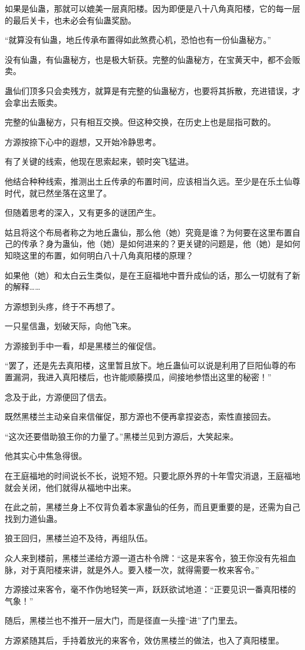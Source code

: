 \begin{this_body}
如果是仙蛊，那就可以媲美一层真阳楼。因为即便是八十八角真阳楼，它的每一层的最后关卡，也未必会有仙蛊奖励。

“就算没有仙蛊，地丘传承布置得如此煞费心机，恐怕也有一份仙蛊秘方。”

没有仙蛊，有仙蛊秘方，也是极大斩获。完整的仙蛊秘方，在宝黄天中，都不会贩卖。

蛊仙们顶多只会卖残方，就算是有完整的仙蛊秘方，也要将其拆散，充进错误，才会拿出去贩卖。

完整的仙蛊秘方，只有相互交换。但这种交换，在历史上也是屈指可数的。

方源按捺下心中的遐想，又开始冷静思考。

有了关键的线索，他现在思索起来，顿时突飞猛进。

他结合种种线索，推测出土丘传承的布置时间，应该相当久远。至少是在乐土仙尊时代，就已然坐落在这里了。

但随着思考的深入，又有更多的谜团产生。

姑且将这个布局者称之为地丘蛊仙，那么他（她）究竟是谁？为何要在这里布置自己的传承？身为蛊仙，他（她）是如何进来的？更关键的问题是，他（她）是如何知晓这里的布置，如何明白八十八角真阳楼的原理？

如果他（她）和太白云生类似，是在王庭福地中晋升成仙的话，那么一切就有了新的解释……

方源想到头疼，终于不再想了。

一只星信蛊，划破天际，向他飞来。

方源接到手中一看，却是黑楼兰的催促信。

“罢了，还是先去真阳楼，这里暂且放下。地丘蛊仙可以说是利用了巨阳仙尊的布置漏洞，我进入真阳楼后，也许能顺藤摸瓜，间接地参悟出这里的秘密！”

念及于此，方源便回了信去。

既然黑楼兰主动亲自来信催促，那方源也不便再拿捏姿态，索性直接回去。

“这次还要借助狼王你的力量了。”黑楼兰见到方源后，大笑起来。

他其实心中焦急得很。

在王庭福地的时间说长不长，说短不短。只要北原外界的十年雪灾消退，王庭福地就会关闭，他们就得从福地中出来。

在此之前，黑楼兰身上不仅背负着本家蛊仙的任务，而且更重要的是，还需为自己找到力道仙蛊。

狼王回归，黑楼兰迫不及待，再组队伍。

众人来到楼前，黑楼兰递给方源一道古朴令牌：“这是来客令，狼王你没有先祖血脉，对于真阳楼来讲，就是外人。要入楼一次，就得需要一枚来客令。”

方源接过来客令，毫不作伪地轻笑一声，跃跃欲试地道：“正要见识一番真阳楼的气象！”

随后，黑楼兰也不推开一层大门，而是径直一头撞“进”了门里去。

方源紧随其后，手持着放光的来客令，效仿黑楼兰的做法，也入了真阳楼里。

\end{this_body}

